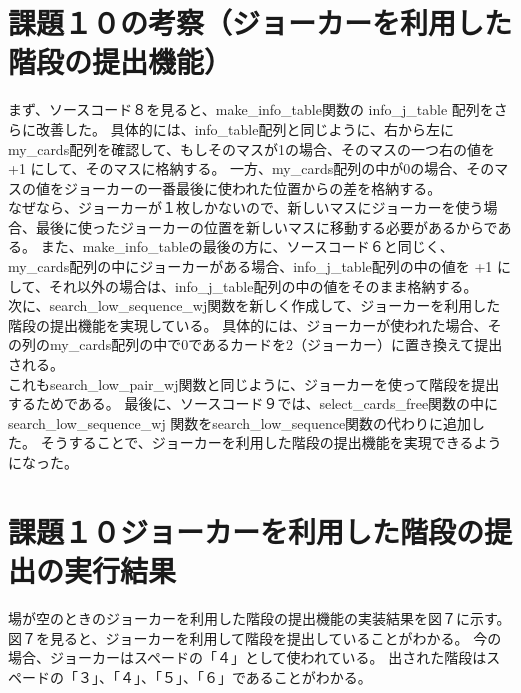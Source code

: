\documentclass[]{jsarticle}
\begin{document}
\section*{課題１０の考察（ジョーカーを利用した階段の提出機能）}
まず、ソースコード８を見ると、make\_info\_table関数の info\_j\_table 配列をさらに改善した。
具体的には、info\_table配列と同じように、右から左にmy\_cards配列を確認して、もしそのマスが1の場合、そのマスの一つ右の値を +1 にして、そのマスに格納する。
一方、my\_cards配列の中が0の場合、そのマスの値をジョーカーの一番最後に使われた位置からの差を格納する。\\

なぜなら、ジョーカーが１枚しかないので、新しいマスにジョーカーを使う場合、最後に使ったジョーカーの位置を新しいマスに移動する必要があるからである。
また、make\_info\_tableの最後の方に、ソースコード６と同じく、my\_cards配列の中にジョーカーがある場合、info\_j\_table配列の中の値を +1 にして、それ以外の場合は、info\_j\_table配列の中の値をそのまま格納する。\\

次に、search\_low\_sequence\_wj関数を新しく作成して、ジョーカーを利用した階段の提出機能を実現している。
具体的には、ジョーカーが使われた場合、その列のmy\_cards配列の中で0であるカードを2（ジョーカー）に置き換えて提出される。\\
これもsearch\_low\_pair\_wj関数と同じように、ジョーカーを使って階段を提出するためである。
最後に、ソースコード９では、select\_cards\_free関数の中に search\_low\_sequence\_wj 関数をsearch\_low\_sequence関数の代わりに追加した。
そうすることで、ジョーカーを利用した階段の提出機能を実現できるようになった。\\

\newpage
\section*{課題１０ジョーカーを利用した階段の提出の実行結果}
場が空のときのジョーカーを利用した階段の提出機能の実装結果を図７に示す。図７を見ると、ジョーカーを利用して階段を提出していることがわかる。
今の場合、ジョーカーはスペードの「４」として使われている。
出された階段はスペードの「３」、「４」、「５」、「６」であることがわかる。\\
\end{document}
